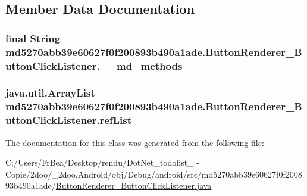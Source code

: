 \subsection{Member Data Documentation}
\hypertarget{classmd5270abb39e60627f0f200893b490a1ade_1_1_button_renderer___button_click_listener_cbb70b7781fb2d4c00834405eb00337a}{
\subsubsection[{\_\-\_\-md\_\-methods}]{\setlength{\rightskip}{0pt plus 5cm}final String {\bf md5270abb39e60627f0f200893b490a1ade.ButtonRenderer\_\-ButtonClickListener.\_\-\_\-md\_\-methods}}}
\label{classmd5270abb39e60627f0f200893b490a1ade_1_1_button_renderer___button_click_listener_cbb70b7781fb2d4c00834405eb00337a}


\hypertarget{classmd5270abb39e60627f0f200893b490a1ade_1_1_button_renderer___button_click_listener_2781bda06e4b65dcdacc8edd70517d98}{
\subsubsection[{refList}]{\setlength{\rightskip}{0pt plus 5cm}java.util.ArrayList {\bf md5270abb39e60627f0f200893b490a1ade.ButtonRenderer\_\-ButtonClickListener.refList}}}
\label{classmd5270abb39e60627f0f200893b490a1ade_1_1_button_renderer___button_click_listener_2781bda06e4b65dcdacc8edd70517d98}




The documentation for this class was generated from the following file:\begin{CompactItemize}
\item 
C:/Users/FrBea/Desktop/rendu/DotNet\_\-todolist\_ - Copie/2doo/\_\-2doo.Android/obj/Debug/android/src/md5270abb39e60627f0f200893b490a1ade/\hyperlink{md5270abb39e60627f0f200893b490a1ade_2_button_renderer___button_click_listener_8java}{ButtonRenderer\_\-ButtonClickListener.java}\end{CompactItemize}
